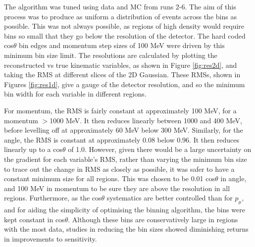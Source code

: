 The algorithm was tuned using data and MC from runs 2-6. The aim of this process was to produce as uniform a distribution of events across the bins as possible. This was not always possible, as regions of high density would require bins so small that they go below the resolution of the detector. The hard coded cos$\theta$ bin edges and momentum step sizes of 100 MeV were driven by this minimum bin size limit. The resolutions are calculated by plotting the reconstructed vs true kinematic variables, as shown in Figure \ref{fig:res2d}, and taking the RMS at different slices of the 2D Gaussian. These RMSs, shown in Figures \ref{fig:res1d}, give a gauge of the detector resolution, and so the minimum bin width for each variable in different regions.

For momentum, the RMS is fairly constant at approximately 100 MeV, for a momentum $>$1000 MeV. It then reduces linearly between 1000 and 400 MeV, before levelling off at approximately 60 MeV below 300 MeV. Similarly, for the angle, the RMS is constant at approximately 0.08 below 0.96. It then reduces linearly up to a cos$\theta$ of 1.0. However, given there would be a large uncertainty on the gradient for each variable's RMS, rather than varying the minimum bin size to trace out the change in RMS as closely as possible, it was safer to have a constant minimum size for all regions. This was chosen to be 0.01 cos$\theta$ in angle, and 100 MeV in momentum to be sure they are above the resolution in all regions. Furthermore, as the cos$\theta$ systematics are better controlled than for $p_{\mu}$, and for aiding the simplicity of optimising the binning algorithm, the bins were kept constant in cos$\theta$. Although these bins are conservatively large in regions with the most data, studies in reducing the bin sizes showed diminishing returns in improvements to sensitivity.

